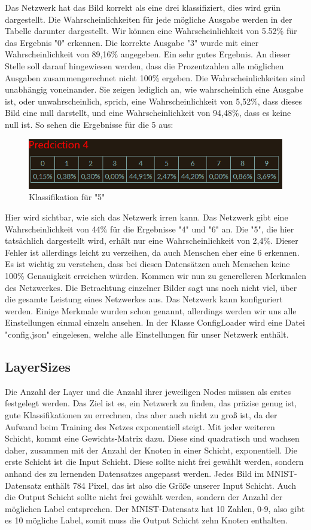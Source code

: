 \documentclass[12pt]{article}
\begin{document}
Das Netzwerk hat das Bild korrekt als eine drei klassifiziert, dies wird grün dargestellt. Die Wahrscheinlichkeiten für jede mögliche Ausgabe werden in der Tabelle darunter dargestellt. Wir können eine Wahrscheinlichkeit von 5.52\% für das Ergebnis "0" erkennen. Die korrekte Ausgabe "3" wurde mit einer Wahrscheinlichkeit von 89,16\% angegeben. Ein sehr gutes Ergebnis. An dieser Stelle soll darauf hingewiesen werden, dass die Prozentzahlen alle möglichen Ausgaben zusammengerechnet nicht 100\% ergeben. Die Wahrscheinlichkeiten sind unabhängig voneinander. Sie zeigen lediglich an, wie wahrscheinlich eine Ausgabe ist, oder unwahrscheinlich, sprich, eine Wahrscheinlichkeit von 5,52\%, dass dieses Bild eine null darstellt, und eine Wahrscheinlichkeit von 94,48\%, dass es keine null ist.
So sehen die Ergebnisse für die 5 aus:\begin{figure}[H]
\centering
\includegraphics[scale=0.60]{./Images/Pasted image 20231001134329.png}
\caption{Klassifikation für "5"}
\label{Klassifikation für "5"}
\end{figure}
Hier wird sichtbar, wie sich das Netzwerk irren kann. Das Netzwerk gibt eine Wahrscheinlichkeit von 44\% für die Ergebnisse "4" und "6" an. Die "5", die hier tatsächlich dargestellt wird, erhält nur eine Wahrscheinlichkeit von 2,4\%. Dieser Fehler ist allerdings leicht zu verzeihen, da auch Menschen eher eine 6 erkennen. Es ist wichtig zu verstehen, dass bei diesen Datensätzen auch Menschen keine 100\% Genauigkeit erreichen würden. Kommen wir nun zu generelleren Merkmalen des Netzwerkes. Die Betrachtung einzelner Bilder sagt uns noch nicht viel, über die gesamte Leistung eines Netzwerkes aus. Das Netzwerk kann konfiguriert werden. Einige Merkmale wurden schon genannt, allerdings werden wir uns alle Einstellungen einmal einzeln ansehen. In der Klasse ConfigLoader wird eine Datei "config.json" eingelesen, welche alle Einstellungen für unser Netzwerk enthält.
\subsection{LayerSizes}
Die Anzahl der Layer und die Anzahl ihrer jeweiligen Nodes müssen als erstes festgelegt werden. Das Ziel ist es, ein Netzwerk zu finden, das präzise genug ist, gute Klassifikationen zu errechnen, das aber auch nicht zu groß ist, da der Aufwand beim Training des Netzes exponentiell steigt. Mit jeder weiteren Schicht, kommt eine Gewichts-Matrix dazu. Diese sind quadratisch und wachsen daher, zusammen mit der Anzahl der Knoten in einer Schicht, exponentiell. 
Die erste Schicht ist die Input Schicht. Diese sollte nicht frei gewählt werden, sondern anhand des zu lernenden Datensatzes angepasst werden. Jedes Bild im MNIST-Datensatz enthält 784 Pixel, das ist also die Größe unserer Input Schicht.
Auch die Output Schicht sollte nicht frei gewählt werden, sondern der Anzahl der möglichen Label entsprechen. Der MNIST-Datensatz hat 10 Zahlen, 0-9, also gibt es 10 mögliche Label, somit muss die Output Schicht zehn Knoten enthalten.
\end{document}
